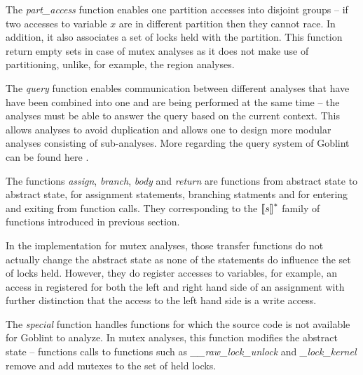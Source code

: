 \documentclass[..thesis.tex]{subfiles}
\begin{document}
The \textit{part\_access} function enables one partition accesses into disjoint groups -- if two accesses to variable $x$ are in different partition then they cannot race.
In addition, it also associates a set of locks held with the partition. This function return empty sets in case of mutex analyses as it does not make use of partitioning,
unlike, for example, the region analyses.

The \textit{query} function enables communication between different analyses that have have been combined into one and are being performed at the same time -- 
the analyses must be able to answer the query based on the current context. This allows analyses to avoid duplication and allows one to design more modular analyses consisting of sub-analyses. More regarding the query system of Goblint can be found here .

The functions \textit{assign}, \textit{branch}, \textit{body} and \textit{return} are functions from abstract state to abstract state, for assignment statements,
branching statments and for entering and exiting from function calls. They corresponding to the $\left\llbracket s \right\rrbracket^{*}$ family of functions introduced in previous section.


In the implementation for mutex analyses, those transfer functions do not actually change the abstract state as none of the statements do influence the set of locks held.
However, they do register accesses to variables, for example, an access in registered for both the left and right hand side of an assignment with further distinction
that the access to the left hand side is a write access.

The \textit{special} function handles functions for which the source code is not available for Goblint to analyze. In mutex analyses,
 this function modifies the abstract state -- functions calls to functions such as \textit{\_\_raw\_lock\_unlock} and \textit{\_lock\_kernel} 
remove and add mutexes to the set of held locks.


\end{document}
